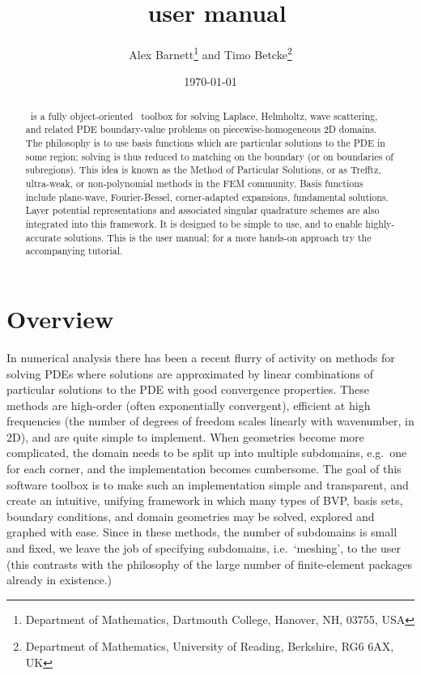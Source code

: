 \documentclass[12pt]{article}
\begin{document}
\title{\mpspack\ user manual}
\author{Alex Barnett\footnote{Department of Mathematics, Dartmouth College, Hanover, NH, 03755, USA}
and Timo Betcke\footnote{Department of Mathematics,
University of Reading, Berkshire, RG6 6AX, UK}}
\date{\today}   %

\maketitle
\begin{abstract}
\mpspack\ is a fully object-oriented \matlab\ toolbox for
solving Laplace, Helmholtz, wave scattering, and related PDE boundary-value
problems
on piecewise-homogeneous 2D domains.
The philosophy is to
use basis functions
which are particular solutions to the
PDE in some region; solving is thus reduced to matching on
the boundary (or on boundaries of subregions).
This idea is known as the Method of Particular Solutions, or as Trefftz,
ultra-weak, or non-polynomial 
methods in the FEM community.
Basis functions include plane-wave, Fourier-Bessel,
corner-adapted expansions,
fundamental solutions.
Layer potential representations and associated
singular quadrature schemes are also integrated into this framework.
It is designed to
be simple to use, and to enable highly-accurate solutions.  This is
the user manual; for a more hands-on approach try the accompanying tutorial.
\end{abstract}

\section{Overview}

In numerical analysis there has been a recent flurry of activity
on methods for solving PDEs where solutions are approximated by
linear combinations of particular solutions to the PDE with
good convergence properties.
These methods are high-order (often exponentially convergent),
efficient at high frequencies (the number of degrees of freedom
scales linearly with wavenumber, in 2D),
and are quite simple to implement.
When geometries become more complicated, the domain needs to be split
up into multiple subdomains, e.g.\ one for each corner, and the
implementation becomes cumbersome.
The goal of this software toolbox is to make such an implementation simple
and transparent, and create an intuitive, unifying framework in which many
types of BVP, basis sets, boundary conditions, and domain geometries
may be solved, explored and graphed with ease.
Since in these methods, the number of subdomains is small and fixed,
we leave the job of specifying subdomains, i.e.\ `meshing',
to the user (this contrasts with the philosophy of the large number of
finite-element packages already in existence.)
\end{document}
